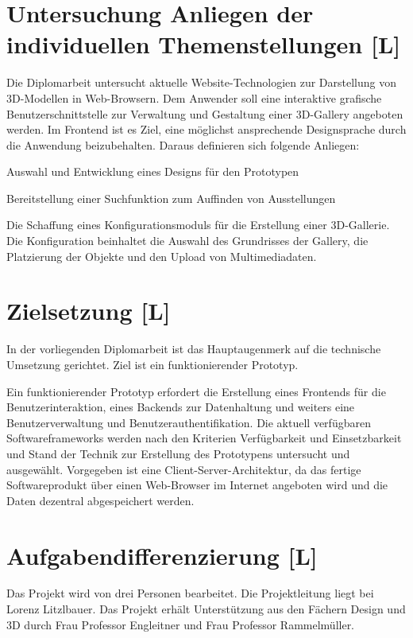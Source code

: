 \section{Untersuchung Anliegen der individuellen Themenstellungen [L]}
Die Diplomarbeit untersucht aktuelle Website-Technologien zur Darstellung von 3D-Modellen in Web-Browsern.
Dem Anwender soll eine interaktive grafische Benutzerschnittstelle zur Verwaltung und Gestaltung einer 3D-Gallery angeboten werden.
Im Frontend ist es Ziel, eine möglichst ansprechende Designsprache durch die Anwendung beizubehalten.
Daraus definieren sich folgende Anliegen:
\begin{compactitem}
    \item Auswahl und Entwicklung eines Designs für den Prototypen
    \item Bereitstellung einer Suchfunktion zum Auffinden von Ausstellungen
    \item Die Schaffung eines Konfigurationsmoduls für die Erstellung einer 3D-Gallerie. Die Konfiguration beinhaltet die Auswahl des Grundrisses der Gallery, die Platzierung der Objekte und den Upload von Multimediadaten.
\end{compactitem}


\section{Zielsetzung [L]}
In der vorliegenden Diplomarbeit ist das Hauptaugenmerk auf die technische Umsetzung gerichtet. Ziel ist ein funktionierender Prototyp.

Ein funktionierender Prototyp erfordert die Erstellung eines Frontends für die Benutzerinteraktion, eines Backends zur Datenhaltung und weiters eine Benutzerverwaltung und Benutzerauthentifikation. Die aktuell verfügbaren Softwareframeworks werden nach den Kriterien Verfügbarkeit und Einsetzbarkeit und Stand der Technik zur Erstellung des Prototypens untersucht und ausgewählt. Vorgegeben ist eine Client-Server-Architektur, da das fertige Softwareprodukt über einen Web-Browser im Internet angeboten wird und die Daten dezentral abgespeichert werden.

\section{Aufgabendifferenzierung [L]}
Das Projekt wird von drei Personen bearbeitet. Die Projektleitung liegt bei Lorenz Litzlbauer. Das Projekt erhält Unterstützung aus den Fächern Design und 3D durch Frau Professor Engleitner und Frau Professor Rammelmüller.

